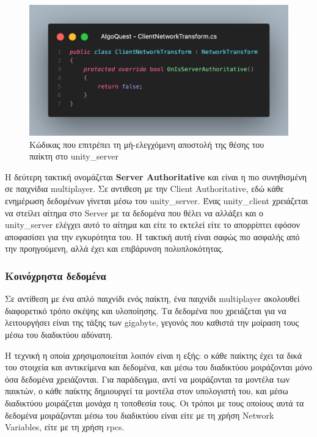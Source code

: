 \begin{figure}[H]
    \centering
    \includegraphics[width=0.8\linewidth]{sections/4/4/images/unity_code_client_network_transform}
    \caption{Κώδικας που επιτρέπει τη μή-ελεγχόμενη αποστολή της θέσης του παίκτη στο \Gls{unity_server}}
    \label{fig:unity_code_client_network_transform}
\end{figure}

Η δεύτερη τακτική ονομάζεται \textbf{Server Authoritative} και είναι η πιο συνηθισμένη σε παιχνίδια \gls{multiplayer}. Σε αντιθεση με την Client Authoritative, εδώ κάθε ενημέρωση δεδομένων γίνεται μέσω του \Gls{unity_server}. Ένας \Gls{unity_client} χρειάζεται να στείλει αίτημα στο Server με τα δεδομένα που θέλει να αλλάξει και ο \Gls{unity_server} ελέγχει αυτό το αίτημα και είτε το εκτελεί είτε το απορρίπτει εφόσον αποφασίσει για την εγκυρότητα του. Η τακτική αυτή είναι σαφώς πιο ασφαλής από την προηγούμενη, αλλά έχει και επιβάρυνση πολυπλοκότητας.


\subsubsection{Κοινόχρηστα δεδομένα}

Σε αντίθεση με ένα απλό παιχνίδι ενός παίκτη, ένα παιχνίδι \gls{multiplayer} ακολουθεί διαφορετικό τρόπο σκέψης και υλοποίησης. Τα δεδομένα που χρειάζεται για να λειτουργήσει είναι της τάξης των gigabyte, γεγονός που καθιστά την μοίραση τους μέσω του διαδικτύου αδύνατη.

Η τεχνική η οποία χρησιμοποιείται λοιπόν είναι η εξής: ο κάθε παίκτης έχει τα δικά του στοιχεία και αντικείμενα και δεδομένα, και μέσω του διαδικτύου μοιράζονται μόνο όσα δεδομένα χρειάζονται. Για παράδειγμα, αντί να μοιράζονται τα μοντέλα των παικτών, ο κάθε παίκτης δημιουργεί τα μοντέλα στον υπολογιστή του, και μέσω διαδικτύου μοιράζεται μονάχα η τοποθεσία τους. Οι τρόποι με τους οποίους αυτά τα δεδομένα μοιράζονται μέσω του διαδικτύου είναι είτε με τη χρήση Network Variables, είτε με τη χρήση \acrshort{rpc}s.

